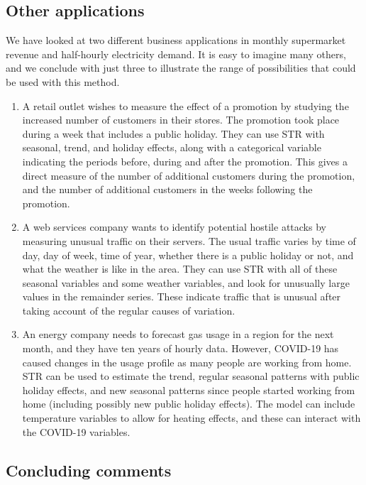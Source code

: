 \documentclass[11pt,a4paper,]{article}
\providecommand{\tightlist}{%
  \setlength{\itemsep}{0pt}\setlength{\parskip}{0pt}}
\begin{document}
\hypertarget{other-applications}{%
\subsection{Other applications}\label{other-applications}}

We have looked at two different business applications in monthly supermarket revenue and half-hourly electricity demand. It is easy to imagine many others, and we conclude with just three to illustrate the range of possibilities that could be used with this method.

\begin{enumerate}
\def\labelenumi{\arabic{enumi}.}
\tightlist
\item
  A retail outlet wishes to measure the effect of a promotion by studying the increased number of customers in their stores. The promotion took place during a week that includes a public holiday. They can use STR with seasonal, trend, and holiday effects, along with a categorical variable indicating the periods before, during and after the promotion. This gives a direct measure of the number of additional customers during the promotion, and the number of additional customers in the weeks following the promotion.
\item
  A web services company wants to identify potential hostile attacks by measuring unusual traffic on their servers. The usual traffic varies by time of day, day of week, time of year, whether there is a public holiday or not, and what the weather is like in the area. They can use STR with all of these seasonal variables and some weather variables, and look for unusually large values in the remainder series. These indicate traffic that is unusual after taking account of the regular causes of variation.
\item
  An energy company needs to forecast gas usage in a region for the next month, and they have ten years of hourly data. However, COVID-19 has caused changes in the usage profile as many people are working from home. STR can be used to estimate the trend, regular seasonal patterns with public holiday effects, and new seasonal patterns since people started working from home (including possibly new public holiday effects). The model can include temperature variables to allow for heating effects, and these can interact with the COVID-19 variables.
\end{enumerate}

\hypertarget{concluding-comments}{%
\subsection{Concluding comments}\label{concluding-comments}}
\end{document}
